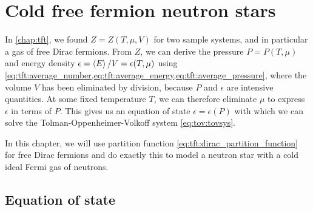 \chapter{Cold free fermion neutron stars}
\label{chap:nstars}





In \cref{chap:tft}, we found $Z = Z(T, \mu, V)$ for two sample systems, and in particular a gas of free Dirac fermions.
From $Z$, we can derive the pressure $P = P(T, \mu)$ and energy density $\epsilon = \left< E \right>/V = \epsilon(T, \mu)$ using \cref{eq:tft:average_number,eq:tft:average_energy,eq:tft:average_pressure}, where the volume $V$ has been eliminated by division, because $P$ and $\epsilon$ are intensive quantities.
At some fixed temperature $T$, we can therefore eliminate $\mu$ to express $\epsilon$ in terms of $P$.
This gives us an equation of state $\epsilon = \epsilon(P)$ with which we can solve the Tolman-Oppenheimer-Volkoff system \eqref{eq:tov:tovsys}.

In this chapter, we will use partition function \eqref{eq:tft:dirac_partition_function} for free Dirac fermions and do exactly this to model a neutron star with a cold ideal Fermi gas of neutrons.

\section{Equation of state}

